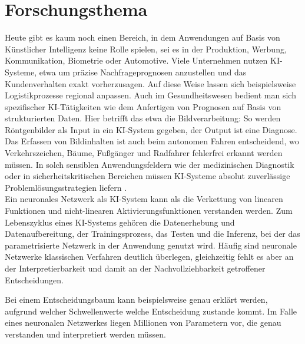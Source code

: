 \documentclass{article}
\theoremstyle{break}
\begin{document}
\section{Forschungsthema}
Heute gibt es kaum noch einen Bereich, in dem Anwendungen auf Basis von Künstlicher Intelligenz keine Rolle spielen, sei es in der Produktion, Werbung, Kommunikation, Biometrie oder Automotive. Viele Unternehmen nutzen KI-Systeme, etwa um präzise Nachfrageprognosen anzustellen und das Kundenverhalten exakt vorherzusagen. Auf diese Weise lassen sich beispielsweise Logistikprozesse regional anpassen. Auch im Gesundheitswesen bedient man sich spezifischer KI-Tätigkeiten wie dem Anfertigen von Prognosen auf Basis von strukturierten Daten. Hier betrifft das etwa die Bildverarbeitung: So werden Röntgenbilder als Input in ein KI-System gegeben, der Output ist eine Diagnose. Das Erfassen von Bildinhalten ist auch beim autonomen Fahren entscheidend, wo Verkehrszeichen, Bäume, Fußgänger und Radfahrer fehlerfrei erkannt werden müssen. In solch sensiblen Anwendungsfeldern wie der medizinischen Diagnostik oder in sicherheitskritischen Bereichen müssen KI-Systeme absolut zuverlässige Problemlösungsstrategien liefern \cite{fh1}.\\

\noindent Ein neuronales Netzwerk als KI-System kann als die Verkettung von linearen Funktionen und nicht-linearen Aktivierungsfunktionen verstanden werden.
Zum Lebenszyklus eines KI-Systems gehören die Datenerhebung und Datenaufbereitung, der Trainingsprozess, das Testen und die Inferenz, bei der das parametrisierte Netzwerk in der Anwendung genutzt wird. Häufig sind neuronale Netzwerke klassischen Verfahren deutlich überlegen, gleichzeitig fehlt es aber an der Interpretierbarkeit und damit an der Nachvollziehbarkeit getroffener Entscheidungen.

\noindent Bei einem Entscheidungsbaum kann beispielsweise genau erklärt werden, aufgrund welcher Schwellenwerte welche Entscheidung zustande kommt. 
Im Falle eines neuronalen Netzwerkes liegen Millionen von Parametern vor, die genau verstanden und interpretiert werden müssen. \\
\end{document}
